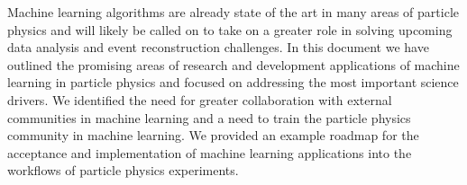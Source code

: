 
Machine learning algorithms are already state of the art in many areas of particle physics and will likely be called on to take on a greater role in solving upcoming data analysis and event reconstruction challenges.
In this document we have outlined the promising areas of research and development applications of machine learning in particle physics and focused on addressing the most important science drivers.
We identified the need for greater collaboration with external communities in machine learning and a need to train the particle physics community in machine learning.
We provided an example roadmap for the acceptance and implementation of machine learning applications into the workflows of particle physics experiments.
